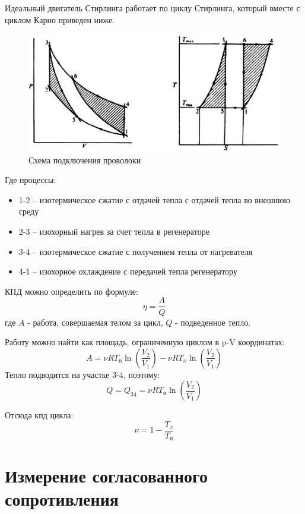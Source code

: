\documentclass[a4paper,14pt]{extarticle}
\begin{document}
			Идеальный двигатель Стирлинга работает по циклу Стирлинга, который вместе с циклом Карно приведен ниже.
			\begin{figure}[h!]
				\centering
				\includegraphics[width=.75\linewidth]{Lab4_1.png}
				\caption{Схема подключения проволоки}
				\label{fig2}
			\end{figure}
		
			Где процессы:
			\begin{itemize}
				\item 1-2 -- изотермическое сжатие с отдачей тепла с отдачей тепла во внешнюю среду
				\item 2-3 -- изохорный нагрев за счет тепла в регенераторе
				\item 3-4 -- изотермическое сжатие с получением тепла от нагревателя
				\item 4-1 -- изохорное охлаждение с передачей тепла регенератору
			\end{itemize}
		
			КПД можно определить по формуле:
			\begin{equation}
				\eta = \frac{A}{Q}
			\end{equation}
			где $A$ - работа, совершаемая телом за цикл, $Q$ - подведенное тепло.
			
			Работу можно найти как площадь, ограниченную циклом в p-V координатах:
			\begin{equation}
				A = \nu R T_\text{н} \ln(\frac{V_2}{V_1}) - \nu R T_x \ln(\frac{V_2}{V_1})
			\end{equation}
			Тепло подводится на участке 3-4, поэтому:
			\begin{equation}
				Q = Q_{34} = \nu R T_\text{н} \ln(\frac{V_2}{V_1})
			\end{equation}
			
			Отсюда кпд цикла:
			\begin{equation}
				\nu = 1 - \frac{T_x}{T_\text{н}}
			\end{equation}
	\section{Измерение согласованного сопротивления}
\end{document}
